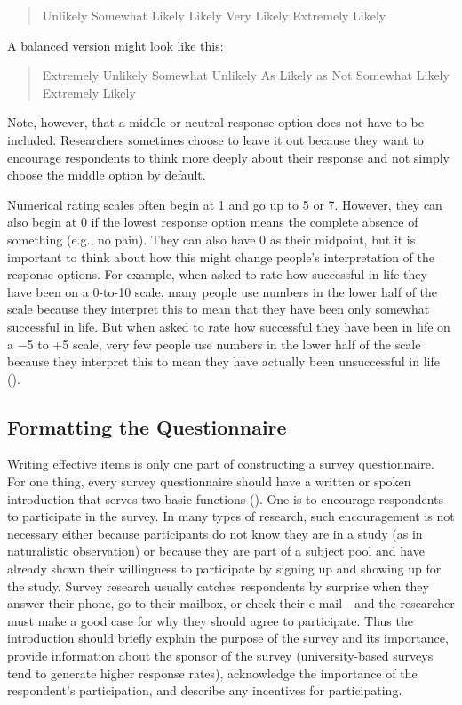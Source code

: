 \documentclass[
]{krantz}
\begin{document}
\begin{quote}
Unlikely \textbar{} Somewhat Likely \textbar{} Likely \textbar{} Very Likely \textbar{} Extremely Likely
\end{quote}

A balanced version might look like this:

\begin{quote}
Extremely Unlikely \textbar{} Somewhat Unlikely \textbar{} As Likely as Not \textbar{} Somewhat Likely \textbar{} Extremely Likely
\end{quote}

Note, however, that a middle or neutral response option does not have to be included. Researchers sometimes choose to leave it out because they want to encourage respondents to think more deeply about their response and not simply choose the middle option by default.

Numerical rating scales often begin at 1 and go up to 5 or 7. However, they can also begin at 0 if the lowest response option means the complete absence of something (e.g., no pain). They can also have 0 as their midpoint, but it is important to think about how this might change people's interpretation of the response options. For example, when asked to rate how successful in life they have been on a 0-to-10 scale, many people use numbers in the lower half of the scale because they interpret this to mean that they have been only somewhat successful in life. But when asked to rate how successful they have been in life on a −5 to +5 scale, very few people use numbers in the lower half of the scale because they interpret this to mean they have actually been unsuccessful in life ().

\subsection*{Formatting the Questionnaire}\label{formatting-the-questionnaire}


Writing effective items is only one part of constructing a survey questionnaire. For one thing, every survey questionnaire should have a written or spoken introduction that serves two basic functions (). One is to encourage respondents to participate in the survey. In many types of research, such encouragement is not necessary either because participants do not know they are in a study (as in naturalistic observation) or because they are part of a subject pool and have already shown their willingness to participate by signing up and showing up for the study. Survey research usually catches respondents by surprise when they answer their phone, go to their mailbox, or check their e-mail---and the researcher must make a good case for why they should agree to participate. Thus the introduction should briefly explain the purpose of the survey and its importance, provide information about the sponsor of the survey (university-based surveys tend to generate higher response rates), acknowledge the importance of the respondent's participation, and describe any incentives for participating.
\end{document}

